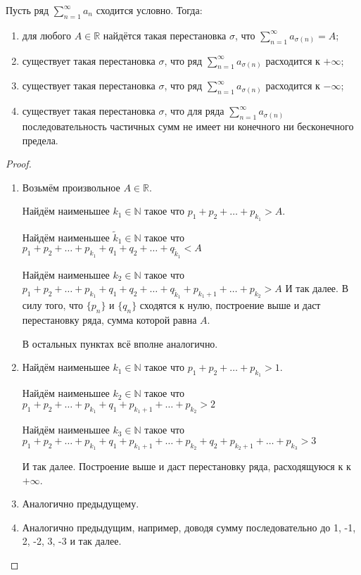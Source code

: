 \documentclass[a4paper, 12pt]{article}
\begin{document}
	\begin{Theorem}[Римана]
		Пусть ряд $\sum\limits_{n=1}^{\infty}a_n$ сходится условно. Тогда:
		\begin{enumerate}
			\item для любого $A \in \mathbb{R}$ найдётся такая перестановка $\sigma$, что $\sum\limits_{n=1}^{\infty}a_{\sigma(n)} = A $;
			\item существует такая перестановка $\sigma$, что ряд $\sum\limits_{n=1}^{\infty}a_{\sigma(n)}$ расходится к $+\infty$;
			\item существует такая перестановка $\sigma$, что ряд $\sum\limits_{n=1}^{\infty}a_{\sigma(n)}$ расходится к $-\infty$;
			\item существует такая перестановка $\sigma$, что для ряда $\sum\limits_{n=1}^{\infty}a_{\sigma(n)}$ последовательность частичных сумм не имеет ни конечного ни бесконечного предела.
		\end{enumerate}
	\end{Theorem}
	\begin{proof} \ 
		\begin{enumerate}
			\item Возьмём произвольное $A \in \mathbb{R}$.  
			
			Найдём наименьшее $k_1 \in \mathbb{N}$ такое что $p_1+p_2+\dots+p_{k_1} > A$. 
			
			Найдём наименьшее $\tilde{k}_1 \in \mathbb{N}$ такое что $p_1+p_2+\dots+p_{k_1} + q_1+q_2 +\dots +q_{\tilde{k}_1} < A$ 
			
			Найдём наименьшее $k_2 \in \mathbb{N}$ такое что $p_1+p_2+\dots+p_{k_1} + q_1+q_2 +\dots +q_{\tilde{k}_1}+ p_{k_1+1}+\dots+p_{k_2} > A$ 
			И так далее. В силу того, что $\{p_n\}$ и $\{q_n\}$ сходятся к нулю, построение выше и даст перестановку ряда, сумма которой равна $A$.
			
			В остальных пунктах всё вполне аналогично.
			\item 
			Найдём наименьшее $k_1 \in \mathbb{N}$ такое что $p_1+p_2+\dots+p_{k_1} > 1$. 
			
			Найдём наименьшее $k_2 \in \mathbb{N}$ такое что $p_1+p_2+\dots+p_{k_1} + q_1+ p_{k_1+1}+\dots+p_{k_2} > 2$ 

			Найдём наименьшее $k_3 \in \mathbb{N}$ такое что $p_1+p_2+\dots+p_{k_1} + q_1+ p_{k_1+1}+\dots+p_{k_2} + q_2
			+ p_{k_2+1}+\dots+p_{k_3} > 3$ 

			И так далее. Построение выше и даст перестановку ряда, расходящуюся к к $+\infty$.
			\item Аналогично предыдущему.
			\item Аналогично предыдущим, например, доводя сумму последовательно до 1, -1, 2, -2, 3, -3 и так далее.
		\end{enumerate}
	\end{proof}
\newpage
\end{document}
